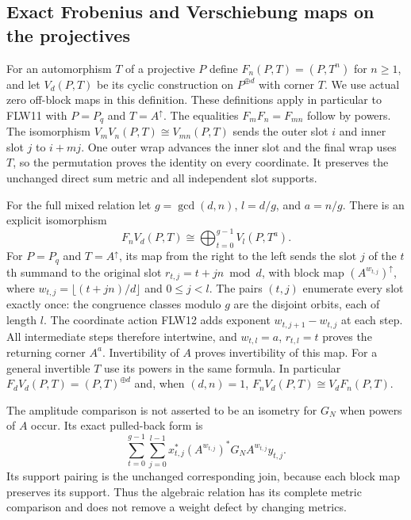 \subsection{Exact Frobenius and Verschiebung maps on the projectives}

For an automorphism $T$ of a projective $P$ define
$F_n(P,T)=(P,T^n)$ for $n\ge1$, and let $V_d(P,T)$ be its cyclic
construction on $P^{\oplus d}$ with corner $T$. We use actual zero
off-block maps in this definition. These definitions apply in
particular to FLW11 with $P=P_q$ and $T=A^\uparrow$.
The equalities $F_mF_n=F_{mn}$ follow by powers.
The isomorphism $V_mV_n(P,T)\cong V_{mn}(P,T)$ sends the outer
slot $i$ and inner slot $j$ to $i+mj$. One outer wrap advances the
inner slot and the final wrap uses $T$, so the permutation proves
the identity on every coordinate. It preserves the unchanged direct
sum metric and all independent slot supports.

For the full mixed relation let $g=\gcd(d,n)$, $l=d/g$, and
$a=n/g$. There is an explicit isomorphism
\[
 F_nV_d(P,T)\cong
        \bigoplus_{t=0}^{g-1}V_l(P,T^a).
 \tag{FLW18}
\]
For $P=P_q$ and $T=A^\uparrow$, its map from the right to the left
sends the slot $j$ of the $t$th summand to the original slot
$r_{t,j}=t+jn\bmod d$, with block map $(A^{w_{t,j}})^\uparrow$,
where $w_{t,j}=\lfloor(t+jn)/d\rfloor$ and $0\le j<l$.
The pairs $(t,j)$ enumerate every slot exactly once: the congruence
classes modulo $g$ are the disjoint orbits, each of length $l$.
The coordinate action FLW12 adds exponent
$w_{t,j+1}-w_{t,j}$ at each step. All intermediate steps therefore
intertwine, and $w_{t,l}=a$, $r_{t,l}=t$ proves the returning corner
$A^a$. Invertibility of $A$ proves invertibility of this map.
For a general invertible $T$ use its powers in the same formula.
In particular $F_dV_d(P,T)=(P,T)^{\oplus d}$ and, when $(d,n)=1$,
$F_nV_d(P,T)\cong V_dF_n(P,T)$.

The amplitude comparison is not asserted to be an isometry for
$G_N$ when powers of $A$ occur. Its exact pulled-back form is
\[
 \sum_{t=0}^{g-1}\sum_{j=0}^{l-1}
   x_{t,j}^*(A^{w_{t,j}})^*G_N A^{w_{t,j}}y_{t,j}.
 \tag{FLW19}
\]
Its support pairing is the unchanged corresponding join, because
each block map preserves its support. Thus the algebraic relation
has its complete metric comparison and does not remove a weight
defect by changing metrics.

